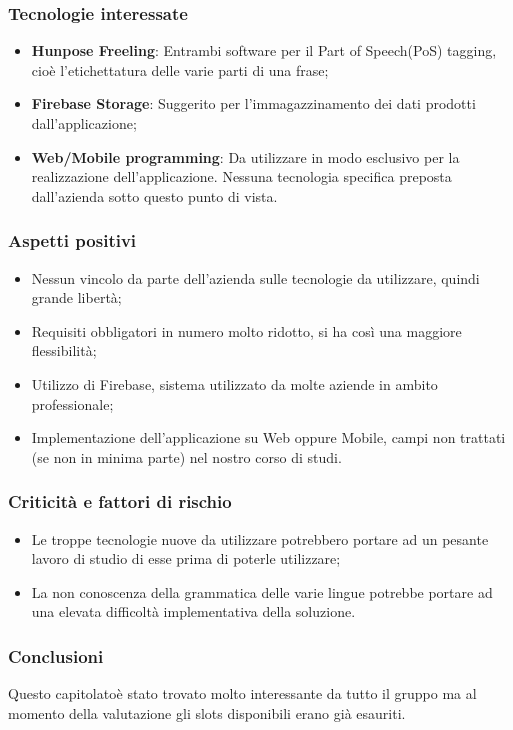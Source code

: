 \subsubsection{Tecnologie interessate}
\begin{itemize}
	\item \textbf{Hunpos\glosp e Freeling\glo}: Entrambi software per il Part of Speech(PoS) tagging, cioè l'etichettatura delle varie parti di una frase;
	\item \textbf{Firebase Storage\glo}: Suggerito per l'immagazzinamento dei dati prodotti dall'applicazione;
	\item \textbf{Web/Mobile programming}: Da utilizzare in modo esclusivo per la realizzazione dell'applicazione. Nessuna tecnologia specifica preposta dall'azienda sotto questo punto di vista.
\end{itemize}
\subsubsection{Aspetti positivi}
\begin{itemize}
	\item Nessun vincolo da parte dell'azienda sulle tecnologie da utilizzare, quindi grande libertà;
	\item Requisiti obbligatori in numero molto ridotto, si ha così una maggiore flessibilità;
	\item Utilizzo di Firebase, sistema utilizzato da molte aziende in ambito professionale;
	\item Implementazione dell'applicazione su Web oppure Mobile, campi non trattati (se non in minima parte) nel nostro corso di studi. 
\end{itemize}
\subsubsection{Criticità e fattori di rischio}
\begin{itemize}
\item Le troppe tecnologie nuove da utilizzare potrebbero portare ad un pesante lavoro di studio di esse prima di poterle utilizzare;
\item La non conoscenza della grammatica delle varie lingue potrebbe portare ad una elevata difficoltà implementativa della soluzione.
\end{itemize}
\subsubsection{Conclusioni}
Questo capitolato\glosp è stato trovato molto interessante da tutto il gruppo ma al momento della valutazione gli slots disponibili erano già esauriti.